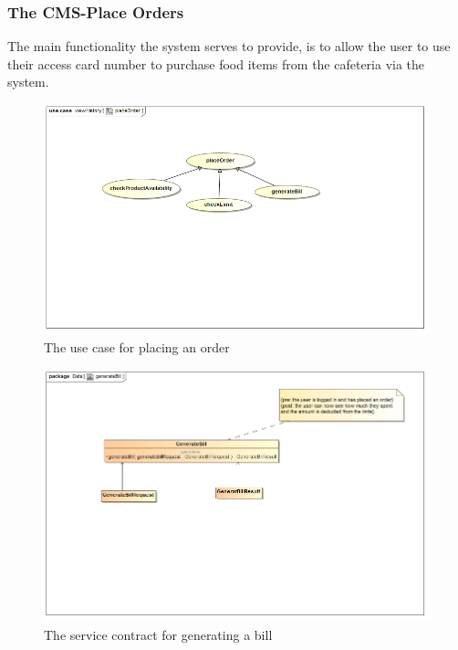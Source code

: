 \documentclass[a4paper,12pt]{article}
\begin{document}
\subsubsection{The CMS-Place Orders}
The main functionality the system serves to provide, is  to allow the user to use their access card number to purchase food items from the cafeteria via the system.
\begin{figure}[H]
  \centering
    \includegraphics[width=1.0\textwidth]{images/placeOrder.png}
    \caption{The use case for placing an order} 
\end{figure}

\begin{figure}[H]
	\centering
	\includegraphics[width=1.0\textwidth]{images/generateBillSC.jpg}
	\caption{The service contract for generating a bill}
\end{figure}
\end{document}
